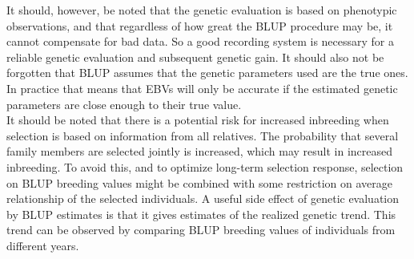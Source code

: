 \documentclass[
]{article}
\begin{document}
It should, however, be noted that the genetic evaluation is based on phenotypic
observations, and that regardless of how great the BLUP procedure may be, it
cannot compensate for bad data. So a good recording system is necessary for a reliable genetic evaluation and subsequent genetic gain. It should also not be forgotten
that BLUP assumes that the genetic parameters used
are the true ones. In practice that means that EBVs will only be accurate if the estimated genetic parameters are close enough to their true value.\\
It should be noted that there is a potential risk for increased inbreeding
when selection is based on information from all relatives.
The probability that several family members are selected jointly is increased,
which may result in increased inbreeding. To avoid this, and to optimize long-term selection response, selection on BLUP breeding values might be combined
with some restriction on average relationship of the selected individuals.
A useful side effect of genetic evaluation by BLUP estimates is that it gives estimates of the
realized genetic trend. This trend can be observed by comparing BLUP breeding values of
individuals from different years.
\end{document}
